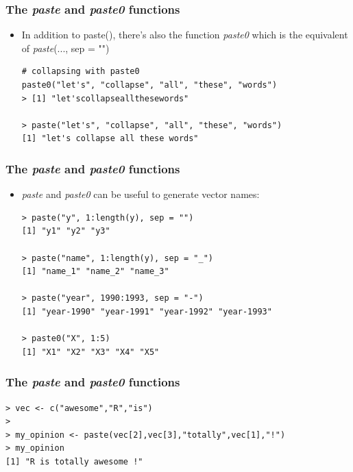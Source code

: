 \documentclass[xcolor=dvipsnames, xcolor=table]{beamer} %
\theoremstyle{mystyle}
\begin{document}
\begin{frame}[fragile]
\frametitle{The \textit{paste} and \textit{paste0} functions}

\begin{itemize}
\item In addition to paste(), there’s also the function \textit{paste0} which is the equivalent of \textit{paste}(..., sep = "")

\begin{verbatim}
# collapsing with paste0
paste0("let's", "collapse", "all", "these", "words")
> [1] "let'scollapseallthesewords"

> paste("let's", "collapse", "all", "these", "words")
[1] "let's collapse all these words"

\end{verbatim}
\end{itemize}

\end{frame}

\begin{frame}[fragile]
\frametitle{The \textit{paste} and \textit{paste0} functions}
\begin{itemize}
\item \textit{paste} and \textit{paste0} can be useful to generate vector names:

\begin{verbatim}
> paste("y", 1:length(y), sep = "")
[1] "y1" "y2" "y3"

> paste("name", 1:length(y), sep = "_")
[1] "name_1" "name_2" "name_3"

> paste("year", 1990:1993, sep = "-")
[1] "year-1990" "year-1991" "year-1992" "year-1993"

> paste0("X", 1:5)
[1] "X1" "X2" "X3" "X4" "X5"
\end{verbatim}
\end{itemize}

\end{frame}

\begin{frame}[fragile] %
\frametitle{The \textit{paste} and \textit{paste0} functions}

\begin{verbatim}
> vec <- c("awesome","R","is")
> 
> my_opinion <- paste(vec[2],vec[3],"totally",vec[1],"!")
> my_opinion
[1] "R is totally awesome !"
\end{verbatim}

\end{frame}
\end{document}

